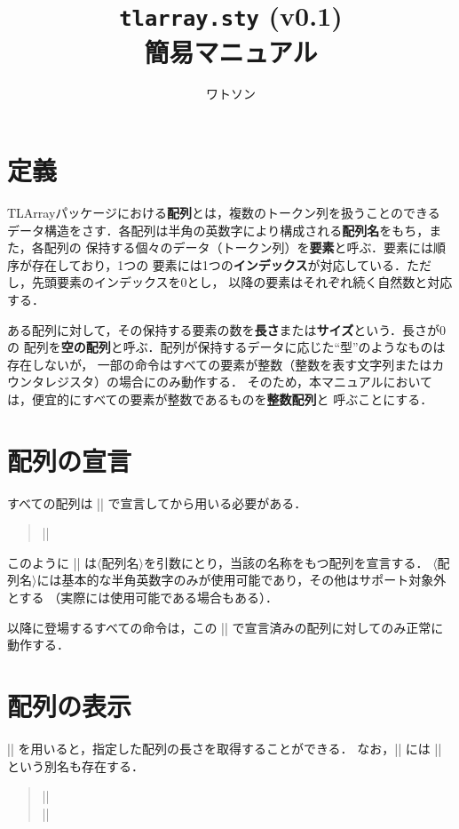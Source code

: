 \documentclass[a4paper,uplatex]{jsarticle}
\title{\texttt{tlarray.sty} (v0.1) \\ 簡易マニュアル}
\author{ワトソン}
\newcommand{\Meta}[1]{$\langle$\mbox{}#1\mbox{}$\rangle$}
\newenvironment{syntax}{\begin{quote}\small}{\end{quote}}
\begin{document}
\maketitle

\section{定義}

\textsf{TLArray}パッケージにおける\textbf{配列}とは，複数のトークン列を扱うことのできる
データ構造をさす．各配列は半角の英数字により構成される\textbf{配列名}をもち，また，各配列の
保持する個々のデータ（トークン列）を\textbf{要素}と呼ぶ．要素には順序が存在しており，1つの
要素には1つの\textbf{インデックス}が対応している．ただし，先頭要素のインデックスを0とし，
以降の要素はそれぞれ続く自然数と対応する．

ある配列に対して，その保持する要素の数を\textbf{長さ}または\textbf{サイズ}という．長さが0の
配列を\textbf{空の配列}と呼ぶ．配列が保持するデータに応じた``型''のようなものは存在しないが，
一部の命令はすべての要素が整数（整数を表す文字列またはカウンタレジスタ）の場合にのみ動作する．
そのため，本マニュアルにおいては，便宜的にすべての要素が整数であるものを\textbf{整数配列}と
呼ぶことにする．

\section{配列の宣言}

すべての配列は |\NewArray| で宣言してから用いる必要がある．
%
\begin{syntax}
|\NewArray{|\Meta{配列名}|}|
\end{syntax}
%
このように |\NewArray| は\Meta{配列名}を引数にとり，当該の名称をもつ配列を宣言する．
\Meta{配列名}には基本的な半角英数字のみが使用可能であり，その他はサポート対象外とする
（実際には使用可能である場合もある）．

以降に登場するすべての命令は，この |\NewArray| で宣言済みの配列に対してのみ正常に動作する．

\section{配列の表示}

|\LengthofArray| を用いると，指定した配列の長さを取得することができる．
なお，|\LengthofArray| には |\SizeofArray| という別名も存在する．
%
\begin{syntax}
|\LengthofArray{|\Meta{配列名}|}| \\
|\SizeofArray{|\Meta{配列名}|}|
\end{syntax}
\end{document}
